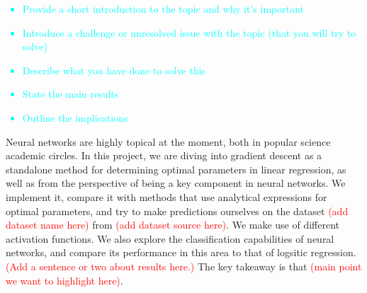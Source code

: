 \begin{adjustwidth}{2cm}{2cm} %
        \textcolor{cyan}{
        \begin{itemize}
            \item Provide a short introduction to the topic and why it's important
            \item Introduce a challenge or unresolved issue with the topic (that you will try to solve)
            \item Describe what you have done to solve this
            \item State the main results
            \item Outline the implications
        \end{itemize}}

        Neural networks are highly topical at the moment, both in popular science academic circles. In this project, we are diving into gradient descent as a standalone method for determining optimal parameters in linear regression, as well as from the perspective of being a key component in neural networks. We implement it, compare it with methods that use analytical expressions for optimal parameters, and try to make predictions ourselves on the dataset \textcolor{red}{(add dataset name here)} from \textcolor{red}{(add dataset source here)}. We make use of different activation functions. We also explore the classification capabilities of neural networks, and compare its performance in this area to that of logsitic regression. \textcolor{red}{(Add a sentence or two about results here.)} The key takeaway is that \textcolor{red}{(main point we want to highlight here)}.
      \end{adjustwidth}

